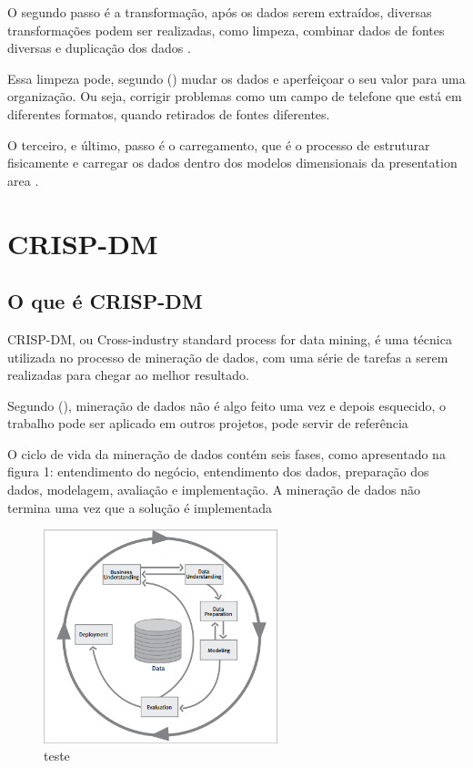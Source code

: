 O segundo passo é a transformação, após os dados serem extraídos, diversas transformações podem ser realizadas, como limpeza, combinar dados de fontes diversas e duplicação dos dados \citep[20]{rk}.

Essa limpeza pode, segundo \citeauthor{rk} (\citeyear[455]{rk}) mudar os dados e aperfeiçoar o seu valor para uma organização. Ou seja, corrigir problemas como um campo de telefone que está em diferentes formatos, quando retirados de fontes diferentes.

O terceiro, e último, passo é o carregamento, que é o processo de estruturar fisicamente e carregar os dados dentro dos modelos dimensionais da presentation area \citep[20]{rk}.

\section{CRISP-DM}
\subsection{O que é CRISP-DM}
CRISP-DM, ou Cross-industry standard process for data mining, é uma técnica utilizada no processo de mineração de dados, com uma série de tarefas a serem realizadas para chegar ao melhor resultado.

Segundo \citeauthor{dmfd} (\citeyear[75]{dmfd}), mineração de dados não é algo feito uma vez e depois esquecido, o trabalho pode ser aplicado em outros projetos, pode servir de referência

O ciclo de vida da mineração de dados contém seis fases, como apresentado na figura 1: entendimento do negócio, entendimento dos dados, preparação dos dados, modelagem, avaliação e implementação. 
A mineração de dados não termina uma vez que a solução é implementada \citep[10]{crispmanual}

\begin{figure}[h]
\centering
\includegraphics[height=6.2cm]{imagens/lifecycle.png}
\caption{teste}
\label{fig:exemplo}
\end{figure}

